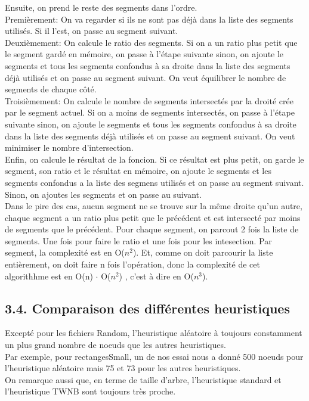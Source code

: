 \documentclass[a4paper,12pt]{report}	%
\begin{document}
    Ensuite, on prend le reste des segments dans l'ordre.\\
    Premièrement: On va regarder si ils ne sont pas déjà dans la liste des segments utilisés. Si il l'est, on passe au segment suivant.\\
    Deuxièmement: On calcule le ratio des segments. Si on a un ratio plus petit que le segment gardé en mémoire,
    on passe à l'étape suivante sinon, on ajoute le segments et tous les segments confondus à sa droite dans la liste des segments déjà utilisés et
    on passe au segment suivant. On veut équilibrer le nombre de segments de chaque côté.\\
    Troisièmement: On calcule le nombre de segments intersectés par la droité crée par le segment actuel. Si on a moins de segments intersectés,
    on passe à l'étape suivante sinon, on ajoute le segments et tous les segments confondus à sa droite dans la liste des segments déjà utilisés et
    on passe au segment suivant. On veut minimiser le nombre d'intersection.\\
    Enfin, on calcule le résultat de la foncion. Si ce résultat est plus petit, on garde le segment, son ratio et le résultat en mémoire,
    on ajoute le segments et les segments confondus a la liste des segmens utilisés et on passe au segment suivant.\\
    Sinon, on ajoutes les segments et on passe au suivant.\\

    Dans le pire des cas, aucun segment ne se trouve sur la même droite qu'un autre, chaque segment a un ratio plus petit que le précédent
    et est intersecté par moins de segments que le précédent.
    Pour chaque segment, on parcout 2 fois la liste de segments. Une fois pour faire le ratio et une fois pour les intesection. Par segment,
    la complexité est en O($n^2$). Et, comme on doit parcourir la liste entièrement, on doit faire n fois l'opération, donc la complexité
    de cet algorithhme est en O(n) $\cdot$ O($n^2$) , c'est à dire en O($n^3$).\\
    
    {\subsection*{3.4. Comparaison des différentes heuristiques}}
      Excepté pour les fichiers Random, l'heuristique aléatoire à toujours constamment un plus grand nombre de noeuds que les autres heuristiques.\\
\indent Par exemple, pour rectangesSmall, un de nos essai nous a donné 500 noeuds pour l'heuristique aléatoire mais 75 et 73 pour les autres heuristiques.\\
\indent On remarque aussi que, en terme de taille d'arbre, l'heuristique standard et l'heuristique TWNB sont toujours très proche.\\
    
\end{document}
